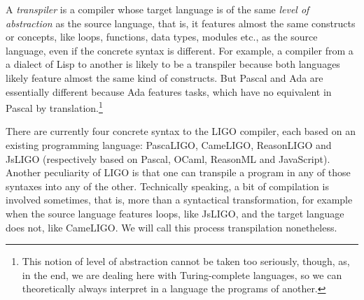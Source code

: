 \documentclass[12pt,a4paper]{article}
\begin{document}
A \emph{transpiler} is a compiler whose target language is of the same
\emph{level of abstraction} as the source language, that is, it
features almost the same constructs or concepts, like loops,
functions, data types, modules etc., as the source language, even if
the concrete syntax is different. For example, a compiler from a a
dialect of Lisp to another is likely to be a transpiler because both
languages likely feature almost the same kind of constructs. But
Pascal and Ada are essentially different because Ada features tasks,
which have no equivalent in Pascal by translation.\footnote{This
  notion of level of abstraction cannot be taken too seriously,
  though, as, in the end, we are dealing here with
  Turing\hyp{}complete languages, so we can theoretically always
  interpret in a language the programs of another.}

There are currently four concrete syntax to the LIGO compiler, each
based on an existing programming language: PascaLIGO, CameLIGO,
ReasonLIGO and JsLIGO (respectively based on Pascal, OCaml, ReasonML
and JavaScript). Another peculiarity of LIGO is that one can transpile
a program in any of those syntaxes into any of the other. Technically
speaking, a bit of compilation is involved sometimes, that is, more
than a syntactical transformation, for example when the source
language features loops, like JsLIGO, and the target language does
not, like CameLIGO. We will call this process transpilation
nonetheless.
\end{document}
